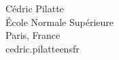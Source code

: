 \documentclass{daj}
\theoremstyle{definition}
\begin{document}
\begin{dajauthors}
\begin{authorinfo}[pgom]
  C\'edric Pilatte\\
  \'Ecole Normale Supérieure\\
  Paris, France\\
  cedric.pilatte\imageat{}ens\imagedot{}fr \\
\end{authorinfo}
\end{dajauthors}
\end{document}
